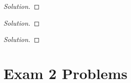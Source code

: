 \begin{problem}[WebAssign, HW 14, \# 3]
\end{problem}
\begin{proof}[Solution]
\end{proof}

\begin{problem}[WebAssign, HW 14, \# 4]
\end{problem}
\begin{proof}[Solution]
\end{proof}

\begin{problem}[WebAssign, HW 14, \# 5]
\end{problem}
\begin{proof}[Solution]
\end{proof}

\section{Exam 2 Problems}

